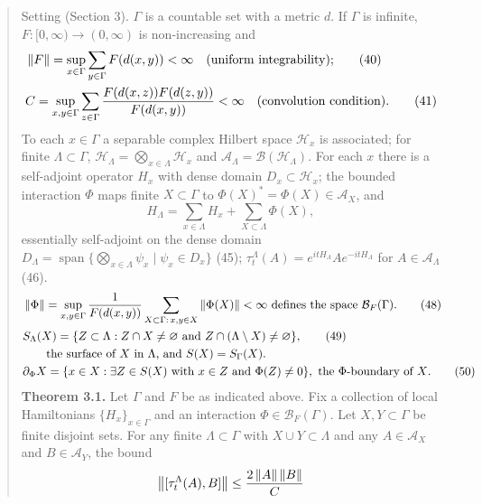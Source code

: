 \begin{quote}\small
Setting (Section 3). $\Gamma$ is a countable set with a metric $d$. If
$\Gamma$ is infinite, $F:[0,\infty)\to(0,\infty)$ is non-increasing and
\begin{align*}
 &\left\lVert F\right\rVert=\sup_{x\in\Gamma}\sum_{y\in\Gamma}F(d(x,y))<\infty
 \quad\text{(uniform integrability);}\tag{40}\\
 &C=\sup_{x,y\in\Gamma}\sum_{z\in\Gamma}\frac{F(d(x,z))F(d(z,y))}{F(d(x,y))}<\infty
 \quad\text{(convolution condition).}\tag{41}
\end{align*}
To each $x\in\Gamma$ a separable complex Hilbert space $\mathcal H_x$ is
associated; for finite $\Lambda\subset\Gamma$,
$\mathcal H_\Lambda=\bigotimes_{x\in\Lambda}\mathcal H_x$ and
$\mathcal A_\Lambda=\mathcal B(\mathcal H_\Lambda)$. For each $x$ there is a
self-adjoint operator $H_x$ with dense domain $D_x\subset\mathcal H_x$; the
bounded interaction $\Phi$ maps finite $X\subset\Gamma$ to
$\Phi(X)^*=\Phi(X)\in\mathcal A_X$, and
\begin{equation*}
 H_\Lambda=\sum_{x\in\Lambda}H_x+\sum_{X\subset\Lambda}\Phi(X),\tag{44}
\end{equation*}
essentially self-adjoint on the dense domain
$D_\Lambda=\operatorname{span}\{\bigotimes_{x\in\Lambda}\psi_x\mid\psi_x\in D_x\}$
(45); $\tau^\Lambda_t(A)=e^{itH_\Lambda}Ae^{-itH_\Lambda}$ for
$A\in\mathcal A_\Lambda$ (46).
\begin{align*}
 &\left\lVert\Phi\right\rVert=\sup_{x,y\in\Gamma}\frac{1}{F(d(x,y))}
 \sum_{X\subset\Gamma:\,x,y\in X}\left\lVert\Phi(X)\right\rVert<\infty
 \ \text{defines the space }\mathcal B_F(\Gamma).\tag{48}\\
 &S_\Lambda(X)=\{Z\subset\Lambda:Z\cap X\ne\varnothing\text{ and }
 Z\cap(\Lambda\setminus X)\ne\varnothing\},\tag{49}\\
 &\qquad\text{the surface of $X$ in $\Lambda$, and } S(X)=S_\Gamma(X).\\
 &\partial_\Phi X=\{x\in X:\exists Z\in S(X)\text{ with }x\in Z\text{ and }
 \Phi(Z)\ne0\},\ \text{the $\Phi$-boundary of $X$.}\tag{50}
\end{align*}
\textbf{Theorem 3.1.} Let $\Gamma$ and $F$ be as indicated above. Fix a
collection of local Hamiltonians $\{H_x\}_{x\in\Gamma}$ and an interaction
$\Phi\in\mathcal B_F(\Gamma)$. Let $X,Y\subset\Gamma$ be finite disjoint sets.
For any finite $\Lambda\subset\Gamma$ with $X\cup Y\subset\Lambda$ and any
$A\in\mathcal A_X$ and $B\in\mathcal A_Y$, the bound
\begin{equation*}
 \norm{[\tau^\Lambda_t(A),B]}\le\frac{2\norm{A}\norm{B}}{C}

\end{equation*}
\end{quote}
